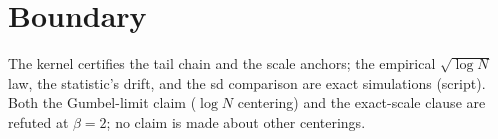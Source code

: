 \documentclass[11pt]{article}
\begin{document}
\section{Boundary}

The kernel certifies the tail chain and the scale anchors; the
empirical $\sqrt{\log N}$ law, the statistic's drift, and the sd
comparison are exact simulations (script). Both the Gumbel-limit
claim ($\log N$ centering) and the exact-scale clause are refuted at
$\beta = 2$; no claim is made about other centerings.
\end{document}
